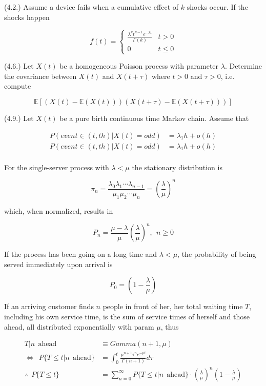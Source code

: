 \documentclass[12pt]{article}
\theoremstyle{nonumberbreak}
\begin{document}
(4.2.) Assume a device fails when a cumulative effect of $k$ shocks occur. If the shocks happen 

$$
f(t) = \begin{cases}
\frac{\lambda^k t^{k-1} e^{-\lambda t}}{\Gamma(k)} & t>0 \\[8pt]
0 & t \le 0
\end{cases}
$$


(4.6.) Let $X(t)$ be a homogeneous Poisson process with parameter $\lambda$. Determine the covariance between $X(t)$ and $X(t + \tau)$ where $t > 0$ and $\tau > 0$, i.e. compute

$$
\mathbb{E} \left[ \left( X(t) - \mathbb{E}(X(t)) \right) \left( X(t+\tau) - \mathbb{E}(X(t+\tau)) \right) \right]
$$



(4.9.) Let $X(t)$ be a pure birth continuous time Markov chain. Assume that 

$$
\begin{aligned}
P(event \in (t, th) | X(t) = odd) &= \lambda_1 h + o(h) \\[8pt]
P(event \in (t, th) | X(t) = odd) &= \lambda_1 h + o(h) \\[8pt]
\end{aligned}
$$


For the single-server process with $\lambda < \mu$ the stationary distribution is 

$$
\pi_n = \frac{\lambda_0 \lambda_1 \cdots \lambda_{n-1} }{\mu_1 \mu_2 \cdots \mu_n} = (\frac{\lambda}{\mu})^n
$$

which, when normalized, results in

$$
P_n = \frac{\mu - \lambda}{\mu} (\frac{\lambda}{\mu})^n, \ \ n \ge 0
$$


If the process has been going on a long time and $\lambda < \mu$, the probability of being served immediately upon arrival is 

$$
P_0 = (1 - \frac{\lambda}{\mu})
$$


If an arriving customer finds $n$ people in front of her, her total waiting time $T$, including his own service time, is the sum of service times of herself and those ahead, all distributed exponentially with param $\mu$, thus 

$$
\begin{aligned}
T | n \ \ \mathrm{ahead} &\equiv Gamma(n+1, \mu) \\[8pt]
\Leftrightarrow \ \ P \{ T \le t | n \ \ \mathrm{ahead}  \} &= \int_0^t \frac{\mu^{n+1} \tau^n e^{-\mu t} }{\Gamma(n+1)} d\tau \\[10pt]
\therefore \ \ P \{ T \le t\} &= \sum_{n=0}^\infty P \{ T \le t | n \ \ \mathrm{ahead} \} \cdot (\frac{\lambda}{\mu})^n (1 - \frac{\lambda}{\mu})
\end{aligned}
$$  
\end{document}
